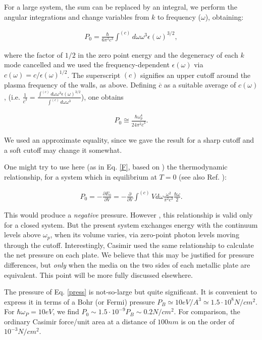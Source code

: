 \documentclass[prl,nofootinbib,twocolumn,showpacs]{revtex4}
\def\bq{\begin{eqnarray}}
\def\ee{\end{eqnarray}}
\begin{document}
For a large system, the sum can be replaced by an integral, we perform the angular
integrations and change variables from $k$ to frequency ($\omega$), obtaining:

\bq P_0 = \frac{\hbar}{6 \pi^2 c^3} \int^{(c)} d \omega  \omega^3 \epsilon(\omega)^{3/2}, \label{pressure-omega}\ee

\noindent where the factor of $1/2$ in the zero point energy and the degeneracy of each
$k$ mode cancelled and we used the frequency-dependent $\epsilon(\omega)$ via $c(\omega)
= c / \epsilon(\omega)^{1/2}$. The superscript $(c)$ signifies an upper cutoff around the
plasma frequency of the walls, as above.
 Defining $\overline{c}$ as a
suitable average of $c(\omega)$, (i.e. $\frac{1}{\overline{c}^3} = \frac{ \int^{(c)} d
\omega \omega^3 \epsilon(\omega)^{3/2}}{\int^{(c)} d \omega \omega^3 }$), one obtains

\bq P_0 \cong  \frac{\hbar \omega_p^4}{24\pi^2 \overline{c}^3}.\label{press}
\ee

We used an approximate equality, since we gave the result  for a sharp cutoff and a soft
cutoff may change it somewhat.



One might \cite{confess} try to use here (as in Eq. \ref{F}, based on \cite{Casimir}) the   thermodynamic relationship,   for a system which
in equilibrium at $T = 0$ (see also Ref. ):

\bq P_0 = - \frac{\partial E_0} {\partial V} = - \frac{\partial} {\partial V} \int^{(c)} V d \omega \frac{\omega^2}{\pi^2
c^3} \frac{\hbar
\omega} {2}. \label{therm}\ee


\noindent This would produce a
 {\em negative} pressure. However \cite{confess}, this relationship is valid only for a
 closed system. But  the present system exchanges energy with the continuum levels above
 $\omega_p$,
 when its volume varies, via zero-point photon levels moving through the cutoff.
 Interestingly, Casimir  used the same relationship to calculate the net pressure on
 each plate. We believe that this may be justified for pressure differences, but
 {\em only} when the media on the two
 sides of each metallic plate are equivalent. This point will be more fully discussed elsewhere.



The pressure of Eq. \ref{press} is not-so-large but quite significant. It is convenient
to express it in terms of a Bohr (or Fermi) pressure $P_B \simeq  10eV / A^3 \simeq 1.5
\cdot 10^8 N/cm^2$. For $\hbar \omega_P = 10eV$, we find $P_0 \sim 1.5 \cdot 10^{-9} P_B
\sim 0.2 N/cm^2$. For comparison, the ordinary Casimir force/unit area at a distance of
$100 nm$ is on the order of $10^{-3}N/cm^2$.
\end{document}
